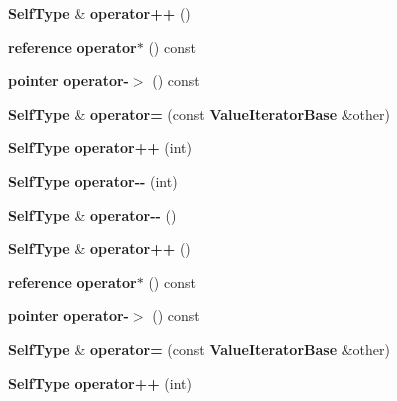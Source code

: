 \begin{DoxyCompactItemize}
\item 
{\bf Self\+Type} \& {\bfseries operator++} ()\label{class_json_1_1_value_const_iterator_a2cfe2f7a94a688186efdafb1b181c319}

\item 
{\bf reference} {\bfseries operator$\ast$} () const \label{class_json_1_1_value_const_iterator_aeb44153d71c61ac9397a84d5ecc244c5}

\item 
{\bf pointer} {\bfseries operator-\/$>$} () const \label{class_json_1_1_value_const_iterator_ac493d31c8eede8af10b71415fe8e624b}

\item 
{\bf Self\+Type} \& {\bfseries operator=} (const {\bf Value\+Iterator\+Base} \&other)\label{class_json_1_1_value_const_iterator_afca9f2ee621a4a47f3e61d6144ce3d0c}

\item 
{\bf Self\+Type} {\bfseries operator++} (int)\label{class_json_1_1_value_const_iterator_ab3f0c2edbfc8f7d60645f3d597d05e28}

\item 
{\bf Self\+Type} {\bfseries operator-\/-\/} (int)\label{class_json_1_1_value_const_iterator_a94935961e9331c6f7b907b05ec8df75e}

\item 
{\bf Self\+Type} \& {\bfseries operator-\/-\/} ()\label{class_json_1_1_value_const_iterator_a31415e44e44e56fb2bfda7e8bb784646}

\item 
{\bf Self\+Type} \& {\bfseries operator++} ()\label{class_json_1_1_value_const_iterator_a2cfe2f7a94a688186efdafb1b181c319}

\item 
{\bf reference} {\bfseries operator$\ast$} () const \label{class_json_1_1_value_const_iterator_aeb44153d71c61ac9397a84d5ecc244c5}

\item 
{\bf pointer} {\bfseries operator-\/$>$} () const \label{class_json_1_1_value_const_iterator_ac493d31c8eede8af10b71415fe8e624b}

\item 
{\bf Self\+Type} \& {\bfseries operator=} (const {\bf Value\+Iterator\+Base} \&other)\label{class_json_1_1_value_const_iterator_afca9f2ee621a4a47f3e61d6144ce3d0c}

\item 
{\bf Self\+Type} {\bfseries operator++} (int)\label{class_json_1_1_value_const_iterator_ab3f0c2edbfc8f7d60645f3d597d05e28}


\end{DoxyCompactItemize}
